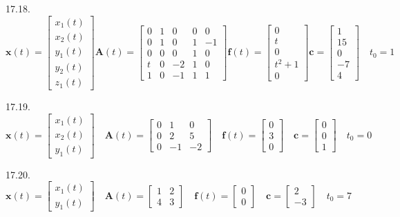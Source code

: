 \documentclass[10pt]{article}
\begin{document}
17.18. $\mathbf{x}(t)=\left[\begin{array}{c}x_{1}(t) \\ x_{2}(t) \\ y_{1}(t) \\ y_{2}(t) \\ z_{1}(t)\end{array}\right] \mathbf{A}(t)=\left[\begin{array}{ccccc}0 & 1 & 0 & 0 & 0 \\ 0 & 1 & 0 & 1 & -1 \\ 0 & 0 & 0 & 1 & 0 \\ t & 0 & -2 & 1 & 0 \\ 1 & 0 & -1 & 1 & 1\end{array}\right] \mathbf{f}(t)=\left[\begin{array}{c}0 \\ t \\ 0 \\ t^{2}+1 \\ 0\end{array}\right] \mathbf{c}=\left[\begin{array}{c}1 \\ 15 \\ 0 \\ -7 \\ 4\end{array}\right] \quad t_{0}=1$

17.19. $\mathbf{x}(t)=\left[\begin{array}{l}x_{1}(t) \\ x_{2}(t) \\ y_{1}(t)\end{array}\right] \quad \mathbf{A}(t)=\left[\begin{array}{rrr}0 & 1 & 0 \\ 0 & 2 & 5 \\ 0 & -1 & -2\end{array}\right] \quad \mathbf{f}(t)=\left[\begin{array}{l}0 \\ 3 \\ 0\end{array}\right] \quad \mathbf{c}=\left[\begin{array}{l}0 \\ 0 \\ 1\end{array}\right] \quad t_{0}=0$

17.20. $\mathbf{x}(t)=\left[\begin{array}{l}x_{1}(t) \\ y_{1}(t)\end{array}\right] \quad \mathbf{A}(t)=\left[\begin{array}{ll}1 & 2 \\ 4 & 3\end{array}\right] \quad \mathbf{f}(t)=\left[\begin{array}{l}0 \\ 0\end{array}\right] \quad \mathbf{c}=\left[\begin{array}{r}2 \\ -3\end{array}\right] \quad t_{0}=7$
\end{document}
